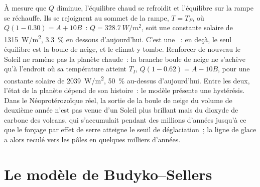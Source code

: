 \begin{omfigure}
\par{}\label{fig:b3:climate-models:zero-d}
\end{omfigure}

À mesure que $Q$ diminue, l'équilibre chaud se refroidit et l'équilibre sur la rampe se
réchauffe. Ils se rejoignent au sommet de la rampe, $T = T_F$, où $Q(1 - 0.30) = A +
10B$~: $Q = \qty{328.7}{W/m^2}$, soit une constante solaire de \qty{1315}{W/m^2},
\qty{3.3}{\percent} en dessous d'aujourd'hui. C'est une ~: en deçà,
le seul équilibre est la boule de neige, et le climat y tombe.
Renforcer de nouveau le Soleil ne ramène pas la planète chaude~: la branche boule de neige
ne s'achève qu'à l'endroit où sa température atteint $T_I$, $Q(1 - 0.62) = A -
10B$, pour une constante solaire de \qty{2039}{W/m^2}, \qty{50}{\percent} au-dessus
d'aujourd'hui. Entre les deux, l'état de la planète dépend de son histoire~:
le modèle présente une hystérésis. Dans le Néoprotérozoïque réel, la sortie de la
boule de neige du volume de deuxième année n'est pas venue d'un Soleil plus brillant mais
du dioxyde de carbone des volcans, qui s'accumulait pendant des millions d'années jusqu'à ce
que le forçage par effet de serre atteigne le seuil de déglaciation~; la ligne de glace
a alors reculé vers les pôles en quelques milliers d'années.

\section{Le modèle de Budyko--Sellers}\label{sec:b3:climate-models:budyko-sellers}

